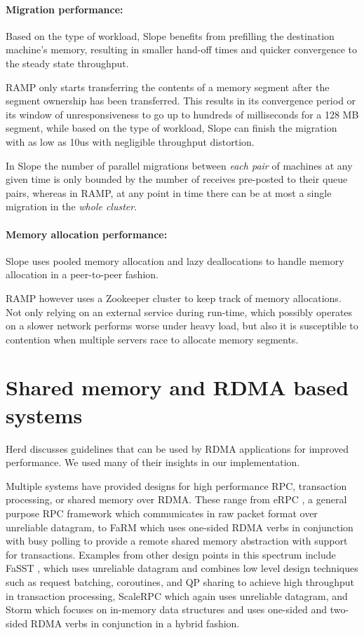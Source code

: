 \paragraph{Migration performance:}
Based on the type of workload, Slope benefits from prefilling the
destination machine's memory, resulting in smaller hand-off times and
quicker convergence to the steady state throughput.


RAMP only starts transferring the contents of a memory segment after
the segment ownership has been transferred. This results in its
convergence period or its window of unresponsiveness to go up to hundreds
of milliseconds for a 128 MB segment, while based on the type of
workload, Slope can finish the migration with as low as 10us with
negligible throughput distortion.

In Slope the number of parallel migrations between \emph{each pair}
of machines at any given time is only bounded by the number of receives
pre-posted to their queue pairs, whereas in RAMP, at any point in time
there can be at most a single migration in the \emph{whole cluster}.


\paragraph{Memory allocation performance:}
Slope uses pooled memory allocation and lazy deallocations to handle
memory allocation in a peer-to-peer fashion.

RAMP however uses a Zookeeper cluster to keep track of memory allocations.
Not only relying on an external service during run-time, which possibly
operates on a slower network performs worse under heavy load, but also it
is susceptible to contention when multiple servers race to allocate memory segments.


\section{Shared memory and RDMA based systems}
Herd \cite{kalia2016designguidelines} discusses guidelines that can be
used by RDMA applications for improved performance. We used many of their
insights in our implementation.

Multiple systems have provided designs
for high performance RPC, transaction processing, or shared memory over
RDMA. These range from eRPC \cite{kalia2019datacenter}, a general purpose
RPC framework which communicates in raw packet format over unreliable
datagram, to FaRM \cite{Dragojevic2014FaRM} which uses one-sided RDMA
verbs in conjunction with busy polling to provide a remote shared memory
abstraction with support for transactions. Examples from other design
points in this spectrum include FaSST \cite{kalia2016fasst}, which uses
unreliable datagram and combines low level design techniques such as
request batching, coroutines, and QP sharing to achieve high throughput
in transaction processing, ScaleRPC \cite{ScaleRPC2019} which again uses unreliable datagram,
and Storm \cite{novakovic2019storm} which
focuses on in-memory data structures and uses
one-sided and two-sided RDMA verbs in conjunction in a hybrid fashion.

